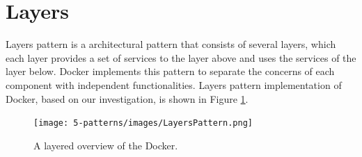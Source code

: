 \section{Layers}
Layers pattern is a architectural pattern that consists of several layers, which
each layer provides a set of services to the layer above and uses the services
of the layer below. Docker implements this pattern to separate the concerns of
each component with independent functionalities. Layers pattern implementation
of Docker, based on our investigation, is shown in Figure \ref{fig:layers-pattern}.

\begin{figure}[H]
\centering
\texttt{[image: 5-patterns/images/LayersPattern.png]}
\caption{A layered overview of the Docker.}
\label{fig:layers-pattern}
\end{figure}

